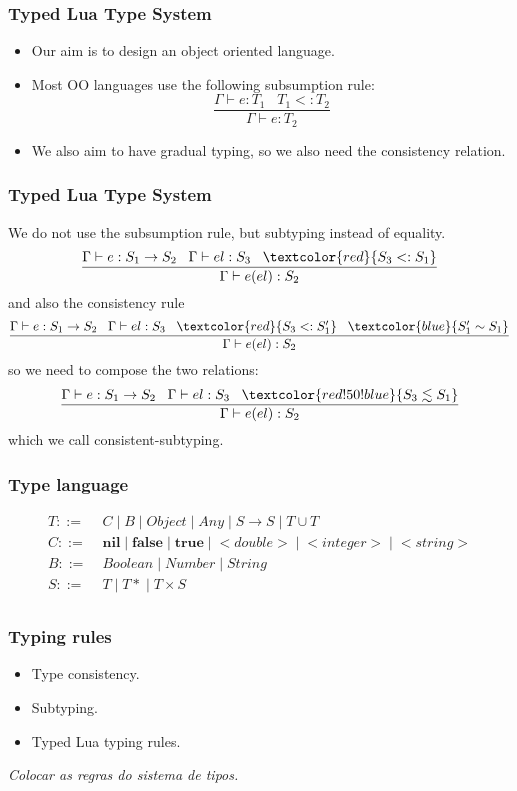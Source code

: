\documentclass{beamer}
\newcommand{\subtype}{<:}
\newcommand{\pipe}{|\;}
\newcommand{\env}{\Gamma}
\begin{document}
\begin{frame}
\frametitle{Typed Lua Type System}
\begin{itemize}
\item Our aim is to design an object oriented language.
\item Most OO languages use the following subsumption rule:
\[
\frac{\env \vdash e:T_{1} \;\;\; T_{1} \subtype T_{2}}
     {\env \vdash e:T_{2}}
\]
\item We also aim to have gradual typing, so we also
need the consistency relation.
\end{itemize}
\end{frame}

\begin{frame}
\frametitle{Typed Lua Type System}
We do not use the subsumption rule, but subtyping
instead of equality.
\[
\frac{\env \vdash e:S_{1} \rightarrow S_{2} \;\;\;
      \env \vdash el:S_{3} \;\;\;
      \textcolor{red}{S_{3} \subtype S_{1}}}
     {\env \vdash e(el):S_{2}}
\]
and also the consistency rule
\[
\frac{\env \vdash e:S_{1} \rightarrow S_{2} \;\;\;
      \env \vdash el:S_{3} \;\;\;
      \textcolor{red}{S_{3} \subtype S_{1}'} \;\;\;
      \textcolor{blue}{S_{1}' \sim S_{1}}}
     {\env \vdash e(el):S_{2}}
\]
so we need to compose the two relations:
\[
\frac{\env \vdash e:S_{1} \rightarrow S_{2} \;\;\;
      \env \vdash el:S_{3} \;\;\;
      \textcolor{red!50!blue}{S_{3} \lesssim S_{1}}}
     {\env \vdash e(el):S_{2}}
\]
which we call consistent-subtyping.
\end{frame}

\begin{frame}
\frametitle{Type language}
\begin{align*}
T ::= \; & C \; \pipe B \; \pipe Object \; \pipe Any \; \pipe
S \rightarrow S \; \pipe T \cup T\\
C ::= \; & \mathbf{nil} \; \pipe \mathbf{false} \; \pipe \mathbf{true} \;
\pipe {<}double{>} \; \pipe {<}integer{>} \; \pipe {<}string{>}\\
B ::= \; & Boolean \; \pipe Number \; \pipe String\\
S ::= \; & T \; \pipe {T*} \; \pipe T \times S\\ 
\end{align*}
\end{frame}

\begin{frame}
\frametitle{Typing rules}
\begin{itemize}
\item Type consistency.
\item Subtyping.
\item Typed Lua typing rules.
\end{itemize}
\end{frame}

\begin{frame}
\textit{Colocar as regras do sistema de tipos.}
\end{frame}
\end{document}
